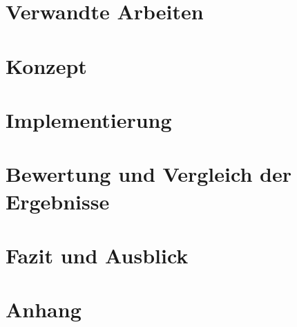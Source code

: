 \documentclass[12pt,a4paper,twoside]{report}
\theoremstyle{definition}
\begin{document}
     \chapter{Verwandte Arbeiten}
    \label{ch:state-of-the-art}
		
    \cleardoublepage

	\chapter{Konzept}
	\label{ch:Konzept}  	
		
    \cleardoublepage    
    
    \chapter{Implementierung}
    \label{ch:implementierung}   
   		
   		
    \chapter{Bewertung und Vergleich der Ergebnisse}
	\label{ch:Bewertung}  
		
    \cleardoublepage    

    \chapter{Fazit und Ausblick}
    \label{ch:Fazit}    
    	
    \cleardoublepage
    


				
		\cleardoublepage
    \appendix
    
    \chapter{Anhang}
    \label{ch:Anhang-ch}
    	
		\cleardoublepage

    \listoftables
    	\cleardoublepage
    \listoffigures
    	\cleardoublepage
    \printindex
    	\cleardoublepage
    \printnomenclature
    \renewcommand{\leftmark}{\uppercase{Abkürzungsverzeichnis}}
    	\cleardoublepage
\end{document}
